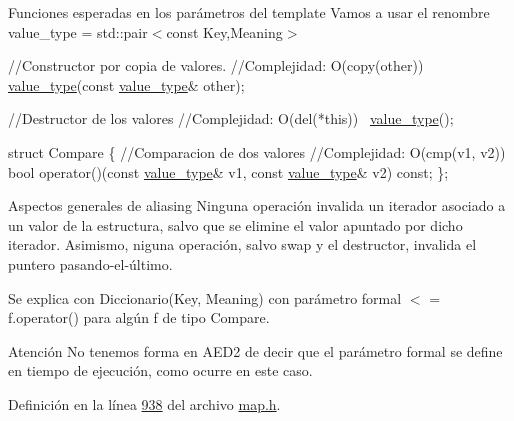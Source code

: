 \begin{DoxyParagraph}{Funciones esperadas en los parámetros del template}
Vamos a usar el renombre value\+\_\+type = std\+::pair$<$const Key,\+Meaning$>$


\begin{DoxyCode}
\textcolor{comment}{//Constructor por copia de valores.}
\textcolor{comment}{//Complejidad: O(copy(other))}
\hyperlink{classaed2_1_1map_a719db98e0ff9a837610f76be33264680_a719db98e0ff9a837610f76be33264680}{value\_type}(\textcolor{keyword}{const} \hyperlink{classaed2_1_1map_a719db98e0ff9a837610f76be33264680_a719db98e0ff9a837610f76be33264680}{value\_type}& other);

\textcolor{comment}{//Destructor de los valores}
\textcolor{comment}{//Complejidad: O(del(*this))}
~\hyperlink{classaed2_1_1map_a719db98e0ff9a837610f76be33264680_a719db98e0ff9a837610f76be33264680}{value\_type}();

\textcolor{keyword}{struct }Compare \{
  \textcolor{comment}{//Comparacion de dos valores}
  \textcolor{comment}{//Complejidad: O(cmp(v1, v2))}
  \textcolor{keywordtype}{bool} operator()(\textcolor{keyword}{const} \hyperlink{classaed2_1_1map_a719db98e0ff9a837610f76be33264680_a719db98e0ff9a837610f76be33264680}{value\_type}& v1, \textcolor{keyword}{const} \hyperlink{classaed2_1_1map_a719db98e0ff9a837610f76be33264680_a719db98e0ff9a837610f76be33264680}{value\_type}& v2) \textcolor{keyword}{const};
\};
\end{DoxyCode}
 
\end{DoxyParagraph}


\begin{DoxyParagraph}{Aspectos generales de aliasing}
Ninguna operación invalida un iterador asociado a un valor de la estructura, salvo que se elimine el valor apuntado por dicho iterador. Asimismo, niguna operación, salvo swap y el destructor, invalida el puntero pasando-\/el-\/último.
\end{DoxyParagraph}
\begin{DoxyParagraph}{Se explica con}
Diccionario(Key, Meaning) con parámetro formal $<$ = f.\+operator() para algún f de tipo Compare.
\end{DoxyParagraph}
\begin{DoxyAttention}{Atención}
No tenemos forma en A\+E\+D2 de decir que el parámetro formal se define en tiempo de ejecución, como ocurre en este caso. 
\end{DoxyAttention}


Definición en la línea \hyperlink{map_8h_source_l00938}{938} del archivo \hyperlink{map_8h_source}{map.\+h}.



